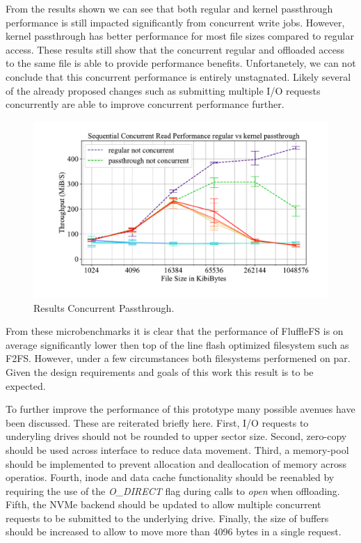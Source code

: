 From the results shown we can see that both regular and kernel passthrough
performance is still impacted significantly from concurrent write jobs.
However, kernel passthrough has better performance for most file sizes compared
to regular access. These results still show that the concurrent regular and
offloaded access to the same file is able to provide performance benefits.
Unfortanetely, we can not conclude that this concurrent performance is entirely
unstagnated. Likely several of the already proposed changes such as submitting
multiple I/O requests concurrently are able to improve concurrent performance
further.

\begin{figure}[h]
    \centering
	\includegraphics[width=1\textwidth]{resources/images/results-concurrent-read.pdf}
	\caption{Results Concurrent Passthrough.}
    \label{figure:concurrentpassthrough}
\end{figure}

From these microbenchmarks it is clear that the performance of FluffleFS is
on average significantly lower then top of the line flash optimized filesystem
such as F2FS. However, under a few circumstances both filesystems
performened on par. Given the design requirements and goals of this work this
result is to be expected.

To further improve the performance of this prototype many possible avenues have
been discussed. These are reiterated briefly here. First, I/O requests to
underyling drives  should not be rounded to upper sector size. Second, zero-copy
should be used across interface to reduce data movement. Third, a memory-pool
should be implemented to prevent allocation and deallocation of memory across
operatios. Fourth, inode and data cache functionality should be reenabled by
requiring the use of the \textit{O\_DIRECT} flag during calls to \textit{open}
when offloading. Fifth, the NVMe backend should be updated to allow multiple
concurrent requests to be submitted to the underlying drive. Finally, the
size of buffers should be increased to allow to move more than 4096 bytes in a
single request.

